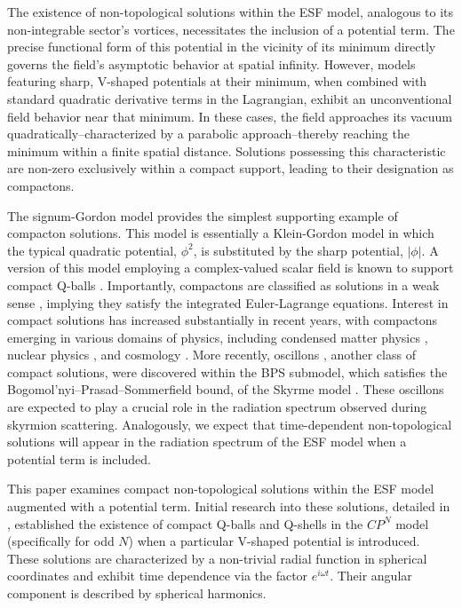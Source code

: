 \documentclass[aps,prd,superscriptaddress,notitlepage,11pt,final,longbibliography,nofootinbib]{revtex4-1}
\numberwithin{equation}{section}
\begin{document}
The existence of non-topological solutions within the ESF model, analogous to its non-integrable sector's vortices, necessitates the inclusion of a potential term. The precise functional form of this potential in the vicinity of its minimum directly governs the field's asymptotic behavior at spatial infinity. However, models featuring sharp, V-shaped potentials at their minimum, when combined with standard quadratic derivative terms in the Lagrangian, exhibit an unconventional field behavior near that minimum. In these cases, the field approaches its vacuum quadratically--characterized by a parabolic approach--thereby reaching the minimum within a finite spatial distance. Solutions possessing this characteristic are non-zero exclusively within a compact support, leading to their designation as compactons.

The signum-Gordon model \cite{Arodz:2005gz, Arodz:2005bc} provides the simplest supporting example of compacton solutions. This model is essentially a Klein-Gordon model in which the typical quadratic potential, $\phi^2$, is substituted by the sharp potential, $|\phi|$. A version of this model employing a complex-valued scalar field is known to support compact Q-balls \cite{Arodz:2008jk, Arodz:2009ye, Arodz:2008nm}. Importantly, compactons are classified as solutions in a weak sense \cite{richtmyer1978, evans1998}, implying they satisfy the integrated Euler-Lagrange equations. Interest in compact solutions has increased substantially in recent years, with compactons emerging in various domains of physics, including condensed matter physics \cite{PhysRevE.60.6218}, nuclear physics \cite{Adam:2010fg}, and cosmology \cite{Hartmann:2013kna}. More recently, oscillons \cite{Arodz:2007jh}, another class of compact solutions, were discovered within the BPS submodel, which satisfies the Bogomol'nyi--Prasad--Sommerfield bound, of the Skyrme model \cite{Adam:2017srx, Klimas:2018woi}. These oscillons are expected to play a crucial role in the radiation spectrum observed during skyrmion scattering. Analogously, we expect that time-dependent non-topological solutions will appear in the radiation spectrum of the ESF model when a potential term is included.

This paper examines compact non-topological solutions within the ESF model augmented with a potential term. Initial research into these solutions, detailed in \cite{Klimas:2017eft}, established the existence of compact Q-balls and Q-shells in the $CP^N$ model (specifically for odd $N$) when a particular V-shaped potential is introduced. These solutions are characterized by a non-trivial radial function in spherical coordinates and exhibit time dependence via the factor $e^{i\omega t}$. Their angular component is described by spherical harmonics.
\end{document}
